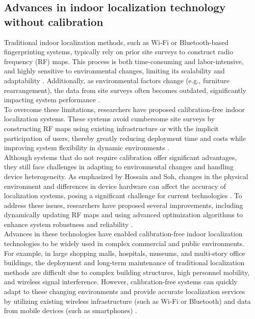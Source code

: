 \documentclass[12pt,a4paper]{article}
\numberwithin{equation}{section}
\begin{document}
\subsection{Advances in indoor localization technology without calibration}
Traditional indoor localization methods, such as Wi-Fi or Bluetooth-based fingerprinting systems, typically rely on prior site surveys to construct radio frequency (RF) maps. This process is both time-consuming and labor-intensive, and highly sensitive to environmental changes, limiting its scalability and adaptability \cite{liu2020survey}. Additionally, as environmental factors change (e.g., furniture rearrangement), the data from site surveys often becomes outdated, significantly impacting system performance \cite{jiang2019indoor}.\\
To overcome these limitations, researchers have proposed calibration-free indoor localization systems. These systems avoid cumbersome site surveys by constructing RF maps using existing infrastructure or with the implicit participation of users, thereby greatly reducing deployment time and costs while improving system flexibility in dynamic environments \cite{HOSSAIN20151,li2018calibrationfree}.\\
Although systems that do not require calibration offer significant advantages, they still face challenges in adapting to environmental changes and handling device heterogeneity. As emphasized by Hossain and Soh, changes in the physical environment and differences in device hardware can affect the accuracy of localization systems, posing a significant challenge for current technologies \cite{HOSSAIN20151}. To address these issues, researchers have proposed several improvements, including dynamically updating RF maps and using advanced optimization algorithms to enhance system robustness and reliability \cite{zhang2020robust}.\\
Advances in these technologies have enabled calibration-free indoor localization technologies to be widely used in complex commercial and public environments. For example, in large shopping malls, hospitals, museums, and multi-story office buildings, the deployment and long-term maintenance of traditional localization methods are difficult due to complex building structures, high personnel mobility, and wireless signal interference. However, calibration-free systems can quickly adapt to these changing environments and provide accurate localization services by utilizing existing wireless infrastructure (such as Wi-Fi or Bluetooth) and data from mobile devices (such as smartphones) \cite{laoudias2018survey,xu2019wireless}.
\end{document}
